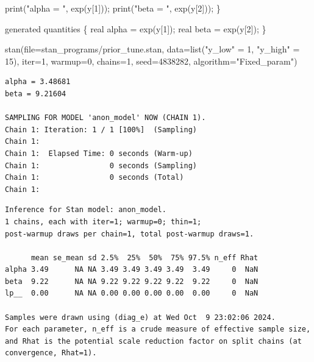 \documentclass[
  letterpaper,
  DIV=11,
  numbers=noendperiod]{scrartcl}
\newenvironment{Shaded}{\begin{snugshade}}{\end{snugshade}}
\newcommand{\AttributeTok}[1]{\textcolor[rgb]{0.40,0.45,0.13}{#1}}
\newcommand{\DataTypeTok}[1]{\textcolor[rgb]{0.68,0.00,0.00}{#1}}
\newcommand{\DecValTok}[1]{\textcolor[rgb]{0.68,0.00,0.00}{#1}}
\newcommand{\FunctionTok}[1]{\textcolor[rgb]{0.28,0.35,0.67}{#1}}
\newcommand{\KeywordTok}[1]{\textcolor[rgb]{0.00,0.23,0.31}{#1}}
\newcommand{\NormalTok}[1]{\textcolor[rgb]{0.00,0.23,0.31}{#1}}
\newcommand{\OtherTok}[1]{\textcolor[rgb]{0.00,0.23,0.31}{#1}}
\newcommand{\StringTok}[1]{\textcolor[rgb]{0.13,0.47,0.30}{#1}}
\begin{document}
\begin{codelisting}
\begin{Shaded}
\begin{Highlighting}[]
  \KeywordTok{print}\NormalTok{(}\StringTok{"alpha = "}\NormalTok{, exp(y[}\DecValTok{1}\NormalTok{]));}
  \KeywordTok{print}\NormalTok{(}\StringTok{"beta = "}\NormalTok{, exp(y[}\DecValTok{2}\NormalTok{]));}
\NormalTok{\}}

\KeywordTok{generated quantities}\NormalTok{ \{}
  \DataTypeTok{real}\NormalTok{ alpha = exp(y[}\DecValTok{1}\NormalTok{]);}
  \DataTypeTok{real}\NormalTok{ beta = exp(y[}\DecValTok{2}\NormalTok{]);}
\NormalTok{\}}
\end{Highlighting}
\end{Shaded}

\end{codelisting}

\begin{Shaded}
\begin{Highlighting}[]
\FunctionTok{stan}\NormalTok{(}\AttributeTok{file=}\StringTok{\textquotesingle{}stan\_programs/prior\_tune.stan\textquotesingle{}}\NormalTok{,}
     \AttributeTok{data=}\FunctionTok{list}\NormalTok{(}\StringTok{"y\_low"} \OtherTok{=} \DecValTok{1}\NormalTok{, }\StringTok{"y\_high"} \OtherTok{=} \DecValTok{15}\NormalTok{),}
     \AttributeTok{iter=}\DecValTok{1}\NormalTok{, }\AttributeTok{warmup=}\DecValTok{0}\NormalTok{, }\AttributeTok{chains=}\DecValTok{1}\NormalTok{,}
     \AttributeTok{seed=}\DecValTok{4838282}\NormalTok{, }\AttributeTok{algorithm=}\StringTok{"Fixed\_param"}\NormalTok{)}
\end{Highlighting}
\end{Shaded}

\begin{verbatim}
alpha = 3.48681
beta = 9.21604

SAMPLING FOR MODEL 'anon_model' NOW (CHAIN 1).
Chain 1: Iteration: 1 / 1 [100%]  (Sampling)
Chain 1: 
Chain 1:  Elapsed Time: 0 seconds (Warm-up)
Chain 1:                0 seconds (Sampling)
Chain 1:                0 seconds (Total)
Chain 1: 
\end{verbatim}

\begin{verbatim}
Inference for Stan model: anon_model.
1 chains, each with iter=1; warmup=0; thin=1; 
post-warmup draws per chain=1, total post-warmup draws=1.

      mean se_mean sd 2.5%  25%  50%  75% 97.5% n_eff Rhat
alpha 3.49      NA NA 3.49 3.49 3.49 3.49  3.49     0  NaN
beta  9.22      NA NA 9.22 9.22 9.22 9.22  9.22     0  NaN
lp__  0.00      NA NA 0.00 0.00 0.00 0.00  0.00     0  NaN

Samples were drawn using (diag_e) at Wed Oct  9 23:02:06 2024.
For each parameter, n_eff is a crude measure of effective sample size,
and Rhat is the potential scale reduction factor on split chains (at 
convergence, Rhat=1).
\end{verbatim}
\end{document}
